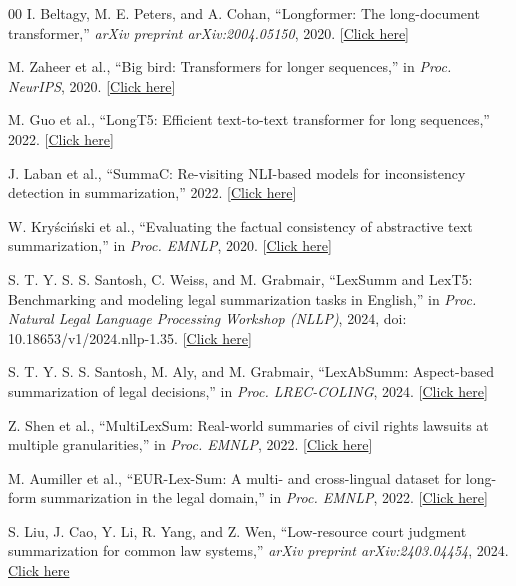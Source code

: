 \documentclass[11pt, a4paper]{article}
\theoremstyle{plain}%
\theoremstyle{remark}%
\theoremstyle{definition}%
\begin{document}
\begin{thebibliography}{00}
I. Beltagy, M. E. Peters, and A. Cohan,
``Longformer: The long-document transformer,''
\emph{arXiv preprint arXiv:2004.05150}, 2020.
[\href{https://arxiv.org/abs/2004.05150}{Click here}]

M. Zaheer et al.,
``Big bird: Transformers for longer sequences,''
in \emph{Proc. NeurIPS}, 2020.
[\href{https://arxiv.org/abs/2007.14062}{Click here}]

M. Guo et al.,
``LongT5: Efficient text-to-text transformer for long sequences,''
2022.
[\href{https://arxiv.org/abs/2112.07916}{Click here}]

J. Laban et al.,
``SummaC: Re-visiting NLI-based models for inconsistency detection in summarization,''
2022.
[\href{https://aclanthology.org/2022.tacl-1.10/}{Click here}]

W. Kryściński et al.,
``Evaluating the factual consistency of abstractive text summarization,''
in \emph{Proc. EMNLP}, 2020.
[\href{https://aclanthology.org/2020.emnlp-main.750/}{Click here}]

S. T. Y. S. S. Santosh, C. Weiss, and M. Grabmair,
``LexSumm and LexT5: Benchmarking and modeling legal summarization tasks in English,''
in \emph{Proc. Natural Legal Language Processing Workshop (NLLP)}, 2024,
doi: 10.18653/v1/2024.nllp-1.35.
[\href{https://aclanthology.org/2024.nllp-1.35/}{Click here}]

S. T. Y. S. S. Santosh, M. Aly, and M. Grabmair,
``LexAbSumm: Aspect-based summarization of legal decisions,''
in \emph{Proc. LREC-COLING}, 2024.
[\href{https://aclanthology.org/2024.lrec-main.911/}{Click here}]

Z. Shen et al.,
``MultiLexSum: Real-world summaries of civil rights lawsuits at multiple granularities,''
in \emph{Proc. EMNLP}, 2022.
[\href{https://proceedings.neurips.cc/paper_files/paper/2022/hash/552ef803bef9368c29e53c167de34b55-Abstract-Datasets_and_Benchmarks.html}{Click here}]

M. Aumiller et al.,
``EUR-Lex-Sum: A multi- and cross-lingual dataset for long-form summarization in the legal domain,''
in \emph{Proc. EMNLP}, 2022.
[\href{https://aclanthology.org/2022.emnlp-main.519/}{Click here}]

S. Liu, J. Cao, Y. Li, R. Yang, and Z. Wen,
``Low-resource court judgment summarization for common law systems,''
\emph{arXiv preprint arXiv:2403.04454}, 2024.
\href{https://arxiv.org/abs/2403.04454}{Click here}


\end{thebibliography}
\end{document}
